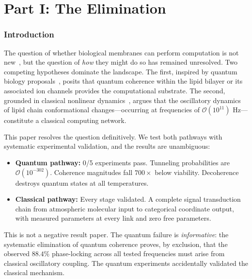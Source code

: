 \documentclass[twocolumn,10pt,a4paper]{article}
\theoremstyle{definition}
\theoremstyle{remark}
\begin{document}
\part*{Part I: The Elimination}

\section{Introduction}
\label{sec:introduction}

The question of whether biological membranes can perform computation is not new~\citep{paun2000membrane, lipowsky1995structure}, but the question of \emph{how} they might do so has remained unresolved. Two competing hypotheses dominate the landscape. The first, inspired by quantum biology proposals~\citep{penrose1989emperor, hameroff1996orchestrated, lambert2013quantum}, posits that quantum coherence within the lipid bilayer or its associated ion channels provides the computational substrate. The second, grounded in classical nonlinear dynamics~\citep{kuramoto1984chemical, strogatz2000nonlinear}, argues that the oscillatory dynamics of lipid chain conformational changes---occurring at frequencies of $\mathcal{O}(10^{11})$ Hz---constitute a classical computing network.

This paper resolves the question definitively. We test both pathways with systematic experimental validation, and the results are unambiguous:

\begin{itemize}[leftmargin=2em]
    \item \textbf{Quantum pathway:} 0/5 experiments pass. Tunneling probabilities are $\mathcal{O}(10^{-302})$. Coherence magnitudes fall $700\times$ below viability. Decoherence destroys quantum states at all temperatures.
    \item \textbf{Classical pathway:} Every stage validated. A complete signal transduction chain from atmospheric molecular input to categorical coordinate output, with measured parameters at every link and zero free parameters.
\end{itemize}

This is not a negative result paper. The quantum failure is \emph{informative}: the systematic elimination of quantum coherence proves, by exclusion, that the observed $88.4\%$ phase-locking across all tested frequencies must arise from classical oscillatory coupling. The quantum experiments accidentally validated the classical mechanism.
\end{document}
